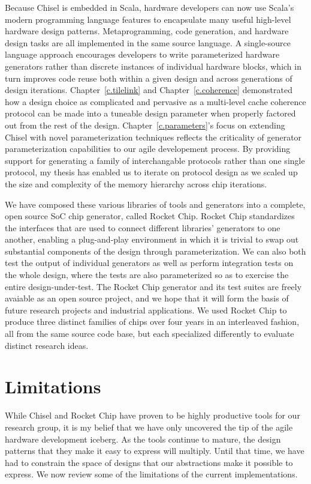 Because Chisel is embedded in Scala, hardware developers can now use Scala's modern programming language features to encapsulate many useful high-level hardware design patterns.
Metaprogramming, code generation, and hardware design tasks are all implemented in the same source language.
A single-source language approach encourages developers to write parameterized hardware generators rather than discrete instances of individual hardware blocks,
which in turn improves code reuse both within a given design and across generations of design iterations.
Chapter~\ref{c.tilelink} and Chapter~\ref{c.coherence} demonstrated how a design choice as complicated and pervasive as a multi-level cache coherence protocol can be made
into a tuneable design parameter when properly factored out from the rest of the design.
Chapter~\ref{c.parameters}'s focus on extending Chisel with novel parameterization techniques reflects the criticality of generator parameterization capabilities to our agile developement process.
By providing support for generating a family of interchangable protocols rather than one single protocol, my thesis has enabled us to iterate on protocol design as we scaled up the size and complexity of the memory hierarchy across chip iterations.

We have composed these various libraries of tools and generators into a complete, open source SoC chip generator, called Rocket Chip.
Rocket Chip  standardizes the interfaces that are used
to connect different libraries' generators to one another, enabling
a plug-and-play environment in which it is trivial to swap out
substantial components of the design through parameterization.
We can also both test the output of individual generators as well as perform
integration tests on the whole design, where the tests are also
parameterized so as to exercise the entire design-under-test.
The Rocket Chip generator and its test suites are freely avaiable as an open source project,
and we hope that it will form the basis of future research projects and industrial applications.
We used Rocket Chip to produce three distinct families of chips over four years in an interleaved fashion, 
all from the same source code base, but each specialized differently to evaluate distinct research ideas.

\section{Limitations}

While Chisel and Rocket Chip have proven to be highly productive tools for our research group,
it is my belief that we have only uncovered the tip of the agile hardware development iceberg.
As the tools continue to mature, the design patterns that they make it easy to express will multiply.
Until that time, we have had to constrain the space of designs that our abstractions make it possible to express.
We now review some of the limitations of the current implementations.

